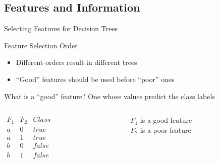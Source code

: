 \documentclass[14pt]{beamer}
\begin{document}
\subsection{Features and Information}
\begin{frame}{Selecting Features for Decision Trees}
	\begin{block}{Feature Selection Order}
		\begin{itemize}
			\item Different orders result in different trees
			\item ``Good'' features should be used before ``poor'' ones
		\end{itemize}
	\end{block}
	\pause
	\begin{block}{What is a ``good'' feature?}
		One whose values predict the class labels \\
	\end{block}
	\pause
	\medskip
	\begin{columns}
		\begin{column}{1.2in}
			$
			\begin{array}{lll}
			F_1 & F_2 & \textit{Class} \\
			\hline
			a & 0 & \textit{true} \\
			a & 1 & \textit{true} \\
			b & 0 & \textit{false} \\
			b & 1 & \textit{false} \\
			\end{array}
			$
		\end{column}
		\pause
		\begin{column}{1.8in}
			$F_1$ is a \alert{good} feature \\
			\bigskip
			$F_2$ is a \alert{poor} feature
		\end{column}
	\end{columns}
\end{frame}
\end{document}

